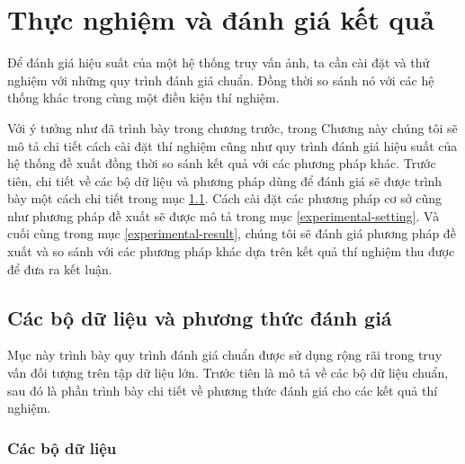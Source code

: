 \chapter{Thực nghiệm và đánh giá kết quả}
\ifpdf
    \graphicspath{{Chapter4/Chapter4Figs/PNG/}{Chapter4/Chapter4Figs/PDF/}{Chapter4/Chapter4Figs/}}
\else
    \graphicspath{{Chapter4/Chapter4Figs/EPS/}{Chapter4/Chapter4Figs/}}
\fi
{}

Để đánh giá hiệu suất của một hệ thống truy vấn ảnh, ta cần cài đặt và thử nghiệm với những quy trình đánh giá chuẩn. Đồng thời so sánh nó với các hệ thống khác trong cùng một điều kiện thí nghiệm.

Với ý tưởng như đã trình bày trong chương trước, trong Chương này chúng tôi sẽ mô tả chi tiết cách cài đặt thí nghiệm cũng như quy trình đánh giá hiệu suất của hệ thống đề xuất đồng thời so sánh kết quả với các phương pháp khác. Trước tiên, chi tiết về các bộ dữ liệu và phương pháp dùng để đánh giá sẽ được trình bày một cách chi tiết trong mục \ref{data-evaluate}. Cách cài đặt các phương pháp cơ sở cũng như phương pháp đề xuất sẽ được mô tả trong mục \ref{experimental-setting}. Và cuối cùng trong mục \ref{experimental-result}, chúng tôi sẽ đánh giá phương pháp đề xuất và so sánh với các phương pháp khác dựa trên kết quả thí nghiệm thu được để đưa ra kết luận.

\section{Các bộ dữ liệu và phương thức đánh giá}
\label{data-evaluate}
Mục này trình bày quy trình đánh giá chuẩn được sử dụng rộng rãi trong truy vấn đối tượng trên tập dữ liệu lớn. Trước tiên là mô tả về các bộ dữ liệu chuẩn, sau đó là phần trình bày chi tiết về phương thức đánh giá cho các kết quả thí nghiệm.

\subsection{Các bộ dữ liệu}

